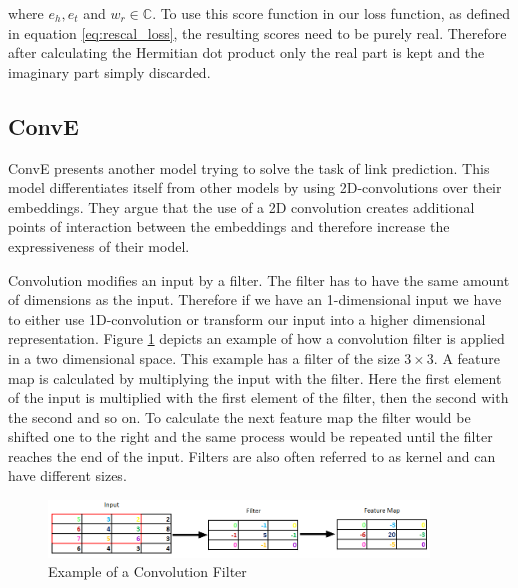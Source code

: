where $e_h, e_t$ and $w_r\in \mathbb{C}$. To use this score function in our loss function, as defined in equation \ref{eq:rescal_loss}, the resulting scores need to be purely real. Therefore after calculating the Hermitian dot product only the real part is kept and the imaginary part simply discarded.  

\subsection{ConvE}
\label{cha:conve}
ConvE \cite{dettmers_convolutional_2018} presents another model trying to solve the task of link prediction. This model differentiates itself from other models by using 2D-convolutions over their embeddings. They argue that the use of a 2D convolution creates additional points of interaction between the embeddings and therefore increase the expressiveness of their model. 

Convolution modifies an input by a filter. The filter has to have the same amount of dimensions as the input. Therefore if we have an 1-dimensional input we have to either use 1D-convolution or transform our input into a higher dimensional representation. Figure \ref{fig:example_conv} depicts an example of how a convolution filter is applied in a two dimensional space. This example has a filter of the size $3 \times 3$. A feature map is calculated by multiplying the input with the filter. Here the first element of the input is multiplied with the first element of the filter, then the second with the second and so on. To calculate the next feature map the filter would be shifted one to the right and the same process would be repeated until the filter reaches the end of the input. Filters are also often referred to as kernel and can have different sizes. \cite{zhang_parallel_1990}

\begin{figure}[H]
\centering
\includegraphics[width=0.9\textwidth]{images/convolution_filter_example.png}
\caption{Example of a Convolution Filter}
\label{fig:example_conv}
\end{figure}

